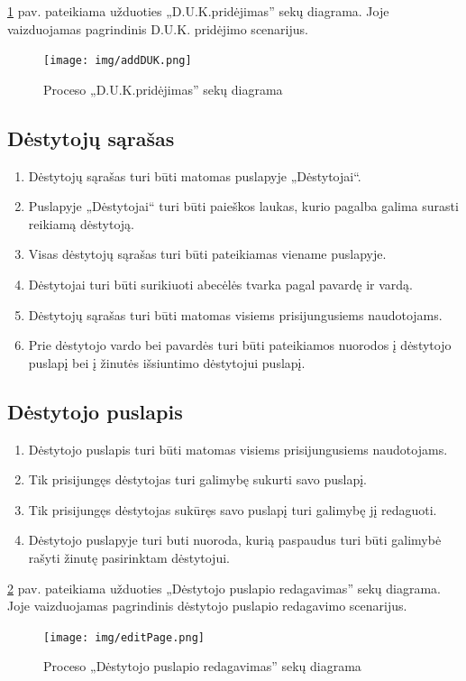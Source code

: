 \documentclass{VUMIFPSkursinis}
\begin{document}
\ref{fig:addduk} pav. pateikiama užduoties „D.U.K.pridėjimas” sekų diagrama. Joje vaizduojamas pagrindinis
D.U.K. pridėjimo scenarijus.
\begin{figure}[H]
	\centering
	\texttt{[image: img/addDUK.png]}
	\caption{Proceso „D.U.K.pridėjimas” sekų diagrama}
	\label{fig:addduk}
\end{figure}

\subsection{Dėstytojų sąrašas}
\begin{enumerate}[label=FR8.\arabic*] 
	\item Dėstytojų sąrašas turi būti matomas puslapyje „Dėstytojai“.
	\item Puslapyje „Dėstytojai“ turi būti paieškos laukas, kurio pagalba galima surasti reikiamą dėstytoją.
	\item Visas dėstytojų sąrašas turi būti pateikiamas viename puslapyje.
	\item Dėstytojai turi būti surikiuoti abecėlės tvarka pagal pavardę ir vardą.
	\item Dėstytojų sąrašas turi būti matomas visiems prisijungusiems naudotojams.
	\item Prie dėstytojo vardo bei pavardės turi būti pateikiamos nuorodos į dėstytojo puslapį bei į žinutės išsiuntimo dėstytojui puslapį.
\end{enumerate}

\subsection{Dėstytojo puslapis}
\begin{enumerate}[label=FR9.\arabic*] 
	\item Dėstytojo puslapis turi būti matomas visiems prisijungusiems naudotojams.
	\item Tik prisijungęs dėstytojas turi galimybę sukurti savo puslapį.
	\item Tik prisijungęs dėstytojas sukūręs savo puslapį turi galimybę jį redaguoti.
	\item Dėstytojo puslapyje turi buti nuoroda, kurią paspaudus turi būti galimybė rašyti žinutę pasirinktam dėstytojui.\newline
\end{enumerate}

\ref{fig:editpage} pav. pateikiama užduoties „Dėstytojo puslapio redagavimas” sekų diagrama. Joje vaizduojamas pagrindinis dėstytojo puslapio redagavimo scenarijus.
\begin{figure}[H]
	\centering
	\texttt{[image: img/editPage.png]}
	\caption{Proceso „Dėstytojo puslapio redagavimas” sekų diagrama}
	\label{fig:editpage}
\end{figure}
\end{document}
